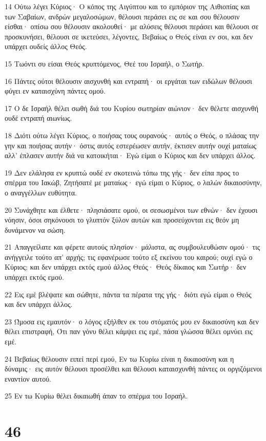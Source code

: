 \par 14 Ούτω λέγει Κύριος· Ο κόπος της Αιγύπτου και το εμπόριον της Αιθιοπίας και των Σαβαίων, ανδρών μεγαλοσώμων, θέλουσι περάσει εις σε και σου θέλουσιν είσθαι· οπίσω σου θέλουσιν ακολουθεί· με αλύσεις θέλουσι περάσει και θέλουσι σε προσκυνήσει, θέλουσι σε ικετεύσει, λέγοντες, Βεβαίως ο Θεός είναι εν σοι, και δεν υπάρχει ουδείς άλλος Θεός.
\par 15 Τωόντι συ είσαι Θεός κρυπτόμενος, Θεέ του Ισραήλ, ο Σωτήρ.
\par 16 Πάντες ούτοι θέλουσιν αισχυνθή και εντραπή· οι εργάται των ειδώλων θέλουσι φύγει εν καταισχύνη πάντες ομού.
\par 17 Ο δε Ισραήλ θέλει σωθή διά του Κυρίου σωτηρίαν αιώνιον· δεν θέλετε αισχυνθή ουδέ εντραπή αιωνίως.
\par 18 Διότι ούτω λέγει Κύριος, ο ποιήσας τους ουρανούς· αυτός ο Θεός, ο πλάσας την γην και ποιήσας αυτήν· όστις αυτός εστερέωσεν αυτήν, έκτισεν αυτήν ουχί ματαίως αλλ' έπλασεν αυτήν διά να κατοικήται· Εγώ είμαι ο Κύριος και δεν υπάρχει άλλος.
\par 19 Δεν ελάλησα εν κρυπτώ ουδέ εν σκοτεινώ τόπω της γής· δεν είπα προς το σπέρμα του Ιακώβ, Ζητήσατέ με ματαίως· εγώ είμαι ο Κύριος, ο λαλών δικαιοσύνην, ο αναγγέλλων ευθύτητα.
\par 20 Συνάχθητε και έλθετε· πλησιάσατε ομού, οι σεσωσμένοι των εθνών· δεν έχουσι νόησιν, όσοι σηκόνουσι το γλυπτόν ξύλον αυτών και προσεύχονται εις θεόν μη δυνάμενον να σώση.
\par 21 Απαγγείλατε και φέρετε αυτούς πλησίον· μάλιστα, ας συμβουλευθώσιν ομού· τις ανήγγειλε τούτο απ' αρχής; τις εφανέρωσε τούτο εξ εκείνου του καιρού; ουχί εγώ ο Κύριος; και δεν υπάρχει εκτός εμού άλλος Θεός· Θεός δίκαιος και Σωτήρ· δεν υπάρχει εκτός εμού.
\par 22 Εις εμέ βλέψατε και σώθητε, πάντα τα πέρατα της γής· διότι εγώ είμαι ο Θεός και δεν υπάρχει άλλος.
\par 23 Ώμοσα εις εμαυτόν· ο λόγος εξήλθεν εκ του στόματός μου εν δικαιοσύνη και δεν θέλει επιστραφή, Ότι παν γόνυ θέλει κάμψει εις εμέ, πάσα γλώσσα θέλει ομνύει εις εμέ.
\par 24 Βεβαίως θέλουσιν ειπεί περί εμού, Εν τω Κυρίω είναι η δικαιοσύνη και η δύναμις· εις αυτόν θέλουσι προσέλθει και θέλουσι καταισχυνθή πάντες οι οργιζόμενοι εναντίον αυτού.
\par 25 Εν τω Κυρίω θέλει δικαιωθή άπαν το σπέρμα του Ισραήλ.

\chapter{46}

